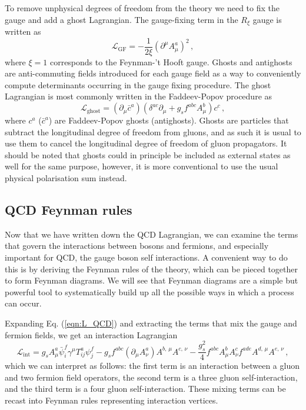 \documentclass[main.tex]{subfiles}
\begin{document}
    To remove unphysical degrees of freedom from the
    theory we need to fix the gauge
    and add a ghost Lagrangian. The gauge-fixing term
    in the $R_{\xi}$ gauge is written as
    \begin{equation}\label{eqn:L_GF}
        \mathcal{L}_{\mathrm{GF}} = -\dfrac{1}{2\xi}(\partial^{\mu}A_{\mu}^{a})^{2} \, ,
    \end{equation}
    where $\xi = 1$ corresponds to the Feynman-'t Hooft gauge.
    Ghosts and antighosts are anti-commuting fields
    introduced for each gauge field as a way to conveniently compute
    determinants occurring in the gauge fixing procedure.
    The ghost Lagrangian is most commonly written
    in the Faddeev-Popov procedure as
    \begin{equation}\label{eqn:L_ghost}
        \mathcal{L}_{\mathrm{ghost}} = (\partial_{\mu}\bar{c}^{a})(\delta^{ac}\partial_{\mu} + g_{s}f^{abc}A^{b}_{\mu})c^{c} \, ,
    \end{equation}
    where $c^{a}$ ($\bar{c}^{a}$) are Faddeev-Popov ghosts (antighosts).
    Ghosts are particles that subtract the longitudinal
    degree of freedom from gluons, and as such it is usual to
    use them to cancel the longitudinal degree of freedom of gluon propagators.
    It should be noted that ghosts could in principle be included as external states as well
    for the same purpose, however, it is more conventional to use the usual physical polarisation sum
    instead.

    \subsection{QCD Feynman rules}\label{sec:qcd_feynman}
    Now that we have written down the QCD Lagrangian,
    we can examine the terms that govern the interactions between
    bosons and fermions, and especially
    important for QCD, the gauge boson self interactions. A convenient
    way to do this is by deriving the Feynman rules of the theory, which can be
    pieced together to form Feynman diagrams. We will see
    that Feynman diagrams are a simple but powerful tool
    to systematically build up all the possible ways in which a process
    can occur.

    Expanding Eq. (\ref{eqn:L_QCD}) and extracting the terms
    that mix the gauge and fermion fields, we get an interaction Lagrangian
    \begin{equation}\label{L_int}
        \mathcal{L}_{\mathrm{int}} = g_{s}A^{a}_{\mu}\bar{\psi}_{i}^{f}\gamma^{\mu}T^{a}_{ij}\psi_{j}^{f}-g_{s}f^{abc}(\partial_{\mu}A^{a}_{\nu})A^{b,\,\mu}A^{c,\,\nu} -\dfrac{g_{s}^{2}}{4}f^{abc}A^{b}_{\mu}A^{c}_{\nu}f^{ade}A^{d,\,\mu}A^{e,\,\nu} \, ,
    \end{equation}
    which we can interpret as follows: the first term
    is an interaction between a gluon and two fermion field operators,
    the second term is a three gluon
    self-interaction, and the third term is a four gluon
    self-interaction. These mixing terms can be recast
    into Feynman rules representing interaction vertices.
\end{document}
